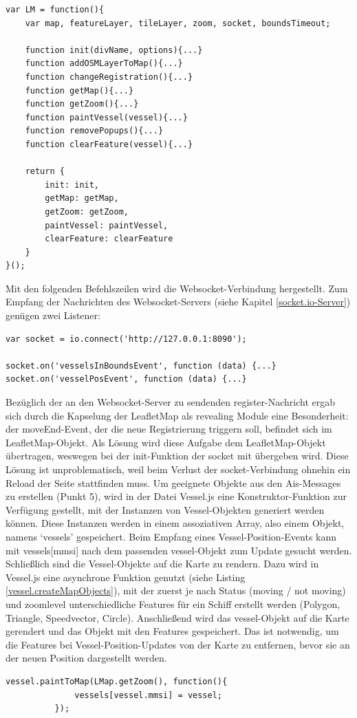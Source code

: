 \begin{lstlisting}[caption= ‘Revealing Module Pattern’ in LeafletMap.js, label=LeafletMap.js]
var LM = function(){
    var map, featureLayer, tileLayer, zoom, socket, boundsTimeout;
	
    function init(divName, options){...}
    function addOSMLayerToMap(){...}
    function changeRegistration(){...}
    function getMap(){...}
    function getZoom(){...}
    function paintVessel(vessel){...}
    function removePopups(){...}
    function clearFeature(vessel){...}
    
    return {
        init: init,
        getMap: getMap,
        getZoom: getZoom,
        paintVessel: paintVessel,
        clearFeature: clearFeature
    }
}();
\end{lstlisting}

Mit den folgenden Befehlszeilen wird die Websocket-Verbindung hergestellt. Zum Empfang der Nachrichten des Websocket-Servers (siehe Kapitel \ref{socket.io-Server}) genügen zwei Listener: 
\begin{lstlisting}[caption=Client-Seite der socket.io-Websocket-Verbindung in ais-socket.io.js,  label=ais-socket.io.js]
var socket = io.connect('http://127.0.0.1:8090');

socket.on('vesselsInBoundsEvent', function (data) {...}
socket.on('vesselPosEvent', function (data) {...}
\end{lstlisting}

Bezüglich der an den Websocket-Server zu sendenden register-Nachricht ergab sich durch die Kapselung der LeafletMap als revealing Module eine Besonderheit: der moveEnd-Event, der die neue Registrierung triggern soll, befindet sich im LeafletMap-Objekt. Als Lösung wird diese Aufgabe dem LeafletMap-Objekt übertragen, weswegen bei der init-Funktion der socket mit übergeben wird. Diese Lösung ist unproblematisch, weil beim Verlust der socket-Verbindung ohnehin ein Reload der Seite stattfinden muss.
Um geeignete Objekte aus den Ais-Messages zu erstellen (Punkt 5), wird in der Datei Vessel.js eine Konstruktor-Funktion zur Verfügung gestellt, mit der Instanzen von Vessel-Objekten generiert werden können. Diese Instanzen werden in einem assoziativen Array, also einem Objekt, namens ‘vessels’ gespeichert. Beim Empfang eines Vessel-Position-Events kann mit vessels[mmsi] nach dem passenden vessel-Objekt zum Update gesucht werden.
Schließlich sind die Vessel-Objekte auf die Karte zu rendern. Dazu wird in Vessel.js eine asynchrone Funktion genutzt (siehe Listing \ref{vessel.createMapObjects}), mit der zuerst je nach Status (moving / not moving) und zoomlevel unterschiedliche Features für ein Schiff erstellt werden (Polygon, Triangle, Speedvector, Circle). Anschließend wird das vessel-Objekt auf die Karte gerendert und das Objekt mit den Features gespeichert. Das ist notwendig, um die Features bei Vessel-Position-Updates von der Karte zu entfernen, bevor sie an der neuen Position dargestellt werden.
\begin{lstlisting}[caption=Aufruf der public function paintToMap des Vessel-Objekts in ais-socket.io.js, label=vessel.paintToMap]
          vessel.paintToMap(LMap.getZoom(), function(){
              vessels[vessel.mmsi] = vessel;
          });
\end{lstlisting}

